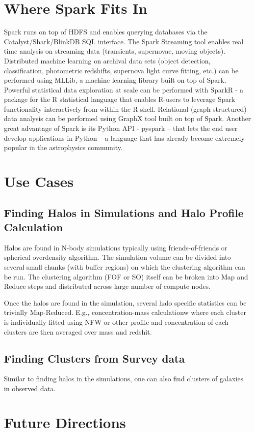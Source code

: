 \documentclass{tufte-handout}
\begin{document}
\section{Where Spark Fits In}
Spark runs on top of  HDFS and enables querying databases via the Catalyst/Shark/BlinkDB SQL interface. The Spark Streaming tool enables real time analysis on streaming data (transients, supernovae, moving objects). Distributed machine learning  on archival  data sets (object detection, classification, photometric redshifts, supernova light curve fitting, etc.) can be performed using  MLLib,  a machine learning library built on top of Spark. Powerful statistical data exploration at scale can be performed with SparkR - a package for the R statistical language that enables R-users to leverage Spark functionality interactively from within the R shell. Relational (graph structured) data analysis can be performed using GraphX tool built on top of Spark.  Another great advantage of Spark is its Python API - pyspark -- that lets the end user develop applications in Python  -- a language that has already become extremely popular in  the astrophysics community. 



\section{Use Cases} 
\subsection{Finding Halos in Simulations and Halo Profile Calculation}
Halos are found in N-body simulations typically using friends-of-friends or spherical overdensity algorithm. The simulation volume can be divided into several small chunks (with buffer regions) on which the clustering algorithm can be run. The clustering algorithm (FOF or SO) itself can be broken into Map and Reduce steps and distributed across large number of compute nodes. 

Once the halos are found in the simulation, several halo specific statistics can be trivially Map-Reduced. E.g., concentration-mass calculationw where each cluster is individually fitted using NFW or other profile and concentration of each clusters are then averaged over mass and redshit. 


\subsection{Finding Clusters from Survey data}
Similar to finding halos in the simulations, one can also find clusters of galaxies in observed data.



\section{Future Directions}
\end{document}
